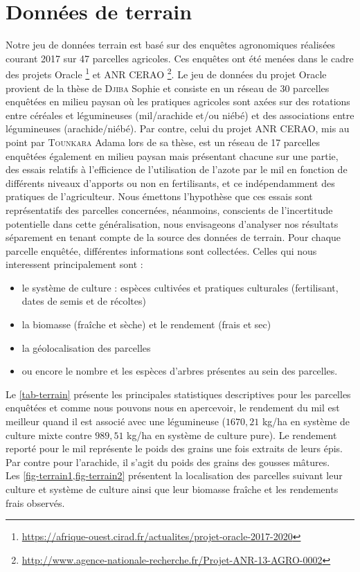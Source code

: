 \section{Données de terrain}

Notre jeu de données terrain est basé sur des enquêtes agronomiques réalisées courant 2017 sur 47 parcelles agricoles. Ces enquêtes ont été menées dans le cadre des projets Oracle \footnote{\url{https://afrique-ouest.cirad.fr/actualites/projet-oracle-2017-2020}} et ANR CERAO \footnote{\url{http://www.agence-nationale-recherche.fr/Projet-ANR-13-AGRO-0002}}. Le jeu de données du projet Oracle provient de la thèse de \textsc{Djiba} Sophie et consiste en un réseau de 30 parcelles enquêtées en milieu paysan où les pratiques agricoles sont 
axées sur des rotations entre céréales et légumineuses (mil/arachide et/ou niébé) et des associations entre légumineuses (arachide/niébé). Par contre, celui du projet ANR CERAO, mis au point par \textsc{Tounkara} Adama lors de sa thèse, est un réseau de 17 parcelles enquêtées également en milieu paysan mais présentant chacune sur une partie, des essais relatifs à l'efficience de l'utilisation de l'azote par le mil en fonction de différents niveaux d'apports ou non en fertilisants, et ce indépendamment des pratiques de l'agriculteur. Nous émettons l'hypothèse que ces essais sont représentatifs des parcelles concernées, néanmoins, conscients de l'incertitude potentielle dans cette généralisation, nous envisageons d'analyser nos résultats séparement en tenant compte de la source des données de terrain. Pour chaque parcelle enquêtée, différentes informations sont collectées. Celles qui nous interessent principalement sont :
\begin{itemize}
 \item le système de culture : espèces cultivées et pratiques culturales (fertilisant, dates de semis et de récoltes)
 \item la biomasse (fraîche et sèche) et le rendement (frais et sec)
 \item la géolocalisation des parcelles
 \item ou encore le nombre et les espèces d'arbres présentes au sein des parcelles.
\end{itemize}
Le \cref{tab-terrain} présente les principales statistiques descriptives pour les parcelles enquêtées et comme nous pouvons nous en apercevoir, le rendement du mil est meilleur quand il est associé avec une légumineuse ($1670,21$ \si[per-mode=symbol]
{\kilogram\per\hectare} en système de culture mixte contre $989,51$ \si[per-mode=symbol]
{\kilogram\per\hectare} en système de culture pure). Le rendement reporté pour le mil représente le poids des grains une fois extraits de leurs épis. Par contre pour l'arachide, il s'agit du poids des grains des gousses mâtures. \\Les \cref{fig-terrain1,fig-terrain2} présentent la localisation des parcelles suivant leur culture et système de culture ainsi que leur biomasse fraîche et les rendements frais observés.


